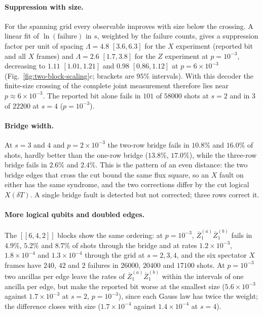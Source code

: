 \documentclass[aps,prx,reprint,superscriptaddress,nofootinbib,floatfix,longbibliography]{revtex4-2}
\theoremstyle{definition}
\begin{document}
\paragraph{Suppression with size.}
For the spanning grid every observable improves with size below the
crossing.  A linear fit of $\ln(\text{failure})$ in $s$, weighted by the
failure counts, gives a suppression factor per unit of spacing
$\Lambda=4.8$ $[3.6,6.3]$ for the $X$ experiment (reported bit and all $X$
frames) and $\Lambda=2.6$ $[1.7,3.8]$ for the $Z$ experiment at $p=10^{-3}$,
decreasing to $1.11$ $[1.01,1.21]$ and $0.98$ $[0.86,1.12]$ at
$p=6\times10^{-3}$ (Fig.~\ref{fig:two-block-scaling}c; brackets are $95\%$
intervals).  With this decoder the finite-size crossing of the complete joint
measurement therefore lies near $p\approx6\times10^{-3}$.  The reported bit
alone fails in $101$ of $58000$ shots at $s=2$ and in $3$ of $22200$ at $s=4$
($p=10^{-3}$).

\paragraph{Bridge width.}
At $s=3$ and $4$ and $p=2\times10^{-3}$ the two-row bridge fails in $10.8\%$
and $16.0\%$ of shots, hardly better than the one-row bridge ($13.8\%$,
$17.0\%$), while the three-row bridge fails in $2.6\%$ and $2.4\%$.  This is
the pattern of an even distance: the two bridge edges that cross the cut bound
the same flux square, so an $X$ fault on either has the same syndrome, and the
two corrections differ by the cut logical $X(\delta T)$.  A single bridge fault
is detected but not corrected; three rows correct it.

\paragraph{More logical qubits and doubled edges.}
The $[[6,4,2]]$ blocks show the same ordering: at $p=10^{-3}$,
$\overline Z_1^{(a)}\overline Z_1^{(b)}$ fails in $4.9\%$, $5.2\%$ and $8.7\%$
of shots through the bridge and at rates $1.2\times10^{-3}$,
$1.8\times10^{-4}$ and $1.3\times10^{-4}$ through the grid at $s=2,3,4$, and
the six spectator $X$ frames have $240$, $42$ and $2$ failures in $26000$,
$20400$ and $17100$ shots.  At $p=10^{-3}$ two ancillas per edge leave the
rates of $\overline Z_1^{(a)}\overline Z_1^{(b)}$ within the intervals of one
ancilla per edge, but make the reported bit worse at the smallest size
($5.6\times10^{-3}$ against $1.7\times10^{-3}$ at $s=2$, $p=10^{-3}$), since each
Gauss law has twice the weight; the difference closes with size
($1.7\times10^{-4}$ against $1.4\times10^{-4}$ at $s=4$).
\end{document}

